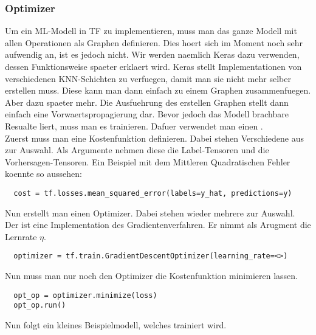 \subsubsection{Optimizer}
Um ein ML-Modell in TF zu implementieren, muss man das ganze Modell mit
allen Operationen als Graphen definieren. Dies hoert sich im Moment noch sehr
aufwendig an, ist es jedoch nicht. Wir werden naemlich Keras dazu verwenden,
dessen Funktionsweise spaeter erklaert wird. Keras stellt Implementationen von
verschiedenen KNN-Schichten zu verfuegen, damit man sie nicht mehr selber
erstellen muss. Diese kann man dann einfach zu einem Graphen zusammenfuegen.
Aber dazu spaeter mehr.
\para{}
Die Ausfuehrung des erstellen Graphen stellt dann einfach eine
Vorwaertspropagierung dar. Bevor jedoch das Modell brachbare Resualte liert,
muss man es trainieren. Dafuer verwendet man einen .
\\
Zuerst muss man eine Kostenfunktion definieren. Dabei stehen Verschiedene aus  zur
Auswahl. Als Argumente nehmen diese die
Label-Tensoren und die Vorhersagen-Tensoren.
Ein Beispiel mit dem Mittleren Quadratischen Fehler koennte so aussehen:
\begin{verbatim}
  cost = tf.losses.mean_squared_error(labels=y_hat, predictions=y)
\end{verbatim}
Nun erstellt man einen Optimizer. Dabei stehen wieder mehrere zur Auswahl. Der
 ist eine Implementation des
Gradientenverfahren. Er nimmt als Arugment die Lernrate $\eta$.
\begin{verbatim}
  optimizer = tf.train.GradientDescentOptimizer(learning_rate=<>)
\end{verbatim}
Nun muss man nur noch den Optimizer die Kostenfunktion minimieren lassen.
\begin{verbatim}
  opt_op = optimizer.minimize(loss)
  opt_op.run()
\end{verbatim}
\para{}
Nun folgt ein kleines Beispielmodell, welches trainiert wird.

